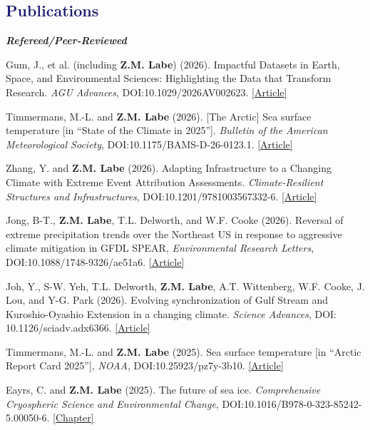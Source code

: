 \documentclass[margin,line,palatino,courier,10pt]{res}
\begin{document}
\begin{resume}
\section{\sc \large{\textcolor{MidnightBlue}{\textbf{Publications}}}} 
\textit{\textbf{Refereed/Peer-Reviewed}}
\vspace*{-0.1in}\\
\begin{etaremune}[leftmargin=0in,topsep=0in,parsep=0in]
\item Gum, J., et al. (including \textbf{Z.M. Labe}) (2026). Impactful Datasets in Earth, Space, and Environmental Sciences: Highlighting the Data that Transform Research. \textit{AGU Advances}, DOI:10.1029/2026AV002623. \href{https://doi.org/10.1029/2026AV002623}{[Article]}
\item Timmermans, M.-L. and \textbf{Z.M. Labe} (2026). [The Arctic] Sea surface temperature [in ``State of the Climate in 2025'']. \textit{Bulletin of the American Meteorological Society}, DOI:10.1175/BAMS-D-26-0123.1. \href{https://doi.org/10.1175/BAMS-D-26-0123.1}{[Article]}
\item Zhang, Y. and \textbf{Z.M. Labe} (2026). Adapting Infrastructure to a Changing Climate with Extreme Event Attribution Assessments. \textit{Climate-Resilient Structures and Infrastructures}, DOI:10.1201/9781003567332-6. \href{https://www.taylorfrancis.com/chapters/edit/10.1201/9781003567332-6/adapting-infrastructure-changing-climate-extreme-event-attribution-assessments-yating-zhang-zachary-labe}{[Article]}
\item Jong, B-T., \textbf{Z.M. Labe}, T.L. Delworth, and W.F. Cooke (2026). Reversal of extreme precipitation trends over the Northeast US in response to aggressive climate mitigation in GFDL SPEAR, \textit{Environmental Research Letters}, DOI:10.1088/1748-9326/ae51a6. \href{https://doi.org/10.1088/1748-9326/ae51a6}{[Article]}
\item Joh, Y., S-W. Yeh, T.L. Delworth, \textbf{Z.M. Labe}, A.T. Wittenberg, W.F. Cooke, J. Lou, and Y-G. Park (2026). Evolving synchronization of Gulf Stream and Kuroshio-Oyashio Extension in a changing climate. \textit{Science Advances}, DOI: 10.1126/sciadv.adx6366. \href{https://www.science.org/doi/10.1126/sciadv.adx6366}{[Article]}
\item Timmermans, M.-L. and \textbf{Z.M. Labe} (2025). Sea surface temperature [in ``Arctic Report Card 2025''], \textit{NOAA}, DOI:10.25923/pz7y-3b10. \href{https://arctic.noaa.gov/report-card/report-card-2025/sea-surface-temperature-2025/}{[Article]}
\item Eayrs, C. and \textbf{Z.M. Labe} (2025). The future of sea ice. \textit{Comprehensive Cryospheric Science and Environmental Change}, DOI:10.1016/B978-0-323-85242-5.00050-6. \href{https://doi.org/10.1016/B978-0-323-85242-5.00050-6}{[Chapter]}

\end{etaremune}
\end{resume}
\end{document}
